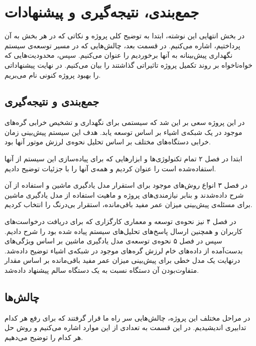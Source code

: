 \chapter{جمع‌بندی، نتیجه‌گیری و پیشنهادات}

در بخش انتهایی این نوشته، ابتدا به توضیح کلی پروژه و نکاتی که در هر بخش به آن پرداختیم، اشاره می‌کنیم. در قسمت بعد، چالش‌هایی که در مسیر توسعه‌ی سیستم نگهداری پیش‌بینانه به آنها برخوردیم را عنوان می‌کنیم. سپس، محدودیت‌هایی که خواه‌‌نا‌خواه بر روند تکمیل پروژه تاثیراتی گذاشتند را بیان می‌کنیم. در نهایت پیشنهاداتی را بهبود پروژه کنونی نام می‌بریم. 


\section{جمع‌بندی و نتیجه‌گیری}
در این پروژه سعی بر این شد که سیستمی برای نگهداری و تشخیص خرابی گره‌های موجود در یک شبکه‌ی اشیاء بر اساس \cite{jung2017vibration} توسعه یابد. هدف این سیستم پیش‌بینی زمان خرابی دستگاه‌های مختلف بر اساس تحلیل نحوه‌ی لرزش موتور آنها بود.

ابتدا در فصل ۲ تمام تکنولوژی‌ها و ابزارهایی که برای پیاده‌سازی این سیستم از آنها استفاده‌شده است را عنوان کردیم و همه‌ی آنها را با جزئیات توضیح دادیم.

در فصل ۳ انواع روش‌های موجود برای استقرار مدل یادگیری ماشین و استفاده از آن شرح داده‌شدند و بنابر نیازمندی‌های پروژه و ماهیت استفاده از مدل یادگیری ماشین برای مسئله‌ی پیش‌بینی میزان عمر مفید باقی‌مانده، استقرار بی‌درنگ را انتخاب کردیم.

در فصل ۴ نیز نحوه‌ی توسعه و معماری کارگزاری که برای دریافت درخواست‌های کاربران و همچنین ارسال پاسخ‌های تحلیل‌های سیستم پیاده شده‌ بود را شرح دادیم. سپس در فصل ۵ نحوه‌ی توسعه‌ی مدل یادگیری ماشین بر اساس ویژگی‌های بدست‌آمده از داده‌های خام لرزش گره‌های موجود در شبکه‌ی اشیاء توضیح داده‌شد. درنهایت یک مدل خطی برای پیش‌بینی میزان عمر مفید باقی‌مانده بر اساس مقدار متفاوت‌بودن آن دستگاه نسبت به یک دستگاه سالم پیشنهاد داده‌شد.


\section{چالش‌ها}
در مراحل مختلف این پروژه، چالش‌هایی سر راه ما قرار گرفتند که برای رفع هر کدام تدابیری اندیشیدیم. در این قسمت به تعدادی از این موارد اشاره می‌کنیم و روش حل هر کدام را توضیح می‌دهیم. 

